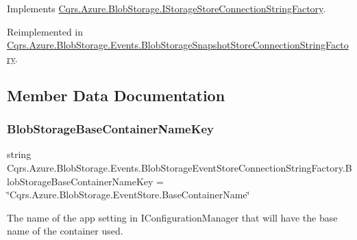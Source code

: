 Implements \hyperlink{interfaceCqrs_1_1Azure_1_1BlobStorage_1_1IStorageStoreConnectionStringFactory_a26ecfd0805fe3d525e9fa419330bd140_a26ecfd0805fe3d525e9fa419330bd140}{Cqrs.\+Azure.\+Blob\+Storage.\+I\+Storage\+Store\+Connection\+String\+Factory}.



Reimplemented in \hyperlink{classCqrs_1_1Azure_1_1BlobStorage_1_1Events_1_1BlobStorageSnapshotStoreConnectionStringFactory_a3b0a626033bedf1dc33951266ac656e4_a3b0a626033bedf1dc33951266ac656e4}{Cqrs.\+Azure.\+Blob\+Storage.\+Events.\+Blob\+Storage\+Snapshot\+Store\+Connection\+String\+Factory}.



\subsection{Member Data Documentation}
\mbox{\label{classCqrs_1_1Azure_1_1BlobStorage_1_1Events_1_1BlobStorageEventStoreConnectionStringFactory_affd6198f87e483bd7a6f5930a5eaa431_affd6198f87e483bd7a6f5930a5eaa431}} 
\subsubsection{\texorpdfstring{Blob\+Storage\+Base\+Container\+Name\+Key}{BlobStorageBaseContainerNameKey}}
{\footnotesize\ttfamily string Cqrs.\+Azure.\+Blob\+Storage.\+Events.\+Blob\+Storage\+Event\+Store\+Connection\+String\+Factory.\+Blob\+Storage\+Base\+Container\+Name\+Key = \char`\"{}Cqrs.\+Azure.\+Blob\+Storage.\+Event\+Store.\+Base\+Container\+Name\char`\"{}\hspace{0.3cm}{\ttfamily [static]}}



The name of the app setting in I\+Configuration\+Manager that will have the base name of the container used. 

